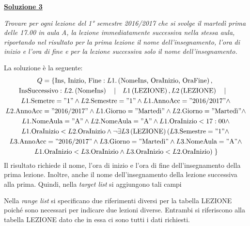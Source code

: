 \documentclass[a4paper]{article}
\begin{document}
	\noindent
	\textcolor{Green4}{\textbf{\underline{Soluzione 3}}}\newline
	
	\noindent
	\emph{Trovare per ogni lezione del 1° semestre 2016/2017 che si svolge il martedì prima delle 17.00 in aula A, la lezione immediatamente successiva nella stessa aula, riportando nel risultato per la prima lezione il nome dell’insegnamento, l’ora di inizio e l’ora di fine e per la lezione successiva solo il nome dell’insegnamento.}\newline
	
	\noindent
	La soluzione è la seguente:
	\begin{gather*}
		Q = \left\{
		\text{Ins, Inizio, Fine}: L1.\left(\text{NomeIns, OraInizio, OraFine}\right), \right. \\
		\text{InsSuccessivo}: L2.\left(\text{NomeIns}\right) \hspace{1em} | \hspace{1em} L1\left(\text{LEZIONE}\right), L2\left(\text{LEZIONE}\right) \hspace{1em} | \hspace{1em} \\
		L1.\text{Semetre} = "1" \land L2.\text{Semestre} = "1" \land L1.\text{AnnoAcc} = "2016/2017" \land \\
		L2.\text{AnnoAcc} = "2016/2017" \land L1.\text{Giorno} = "\text{Martedì}" \land L2.\text{Giorno} = "\text{Martedì}" \land \\
		L1.\text{NomeAula} = "\text{A}" \land L2.\text{NomeAula} = "\text{A}" \land L1.\text{OraInizio} < 17:00 \land \\ L1.\text{OraInizio} < L2.\text{OraInizio} \land \lnot \exists L3\left(\text{LEZIONE}\right)\left( L3.\text{Semestre} = "1" \land \right. \\
		L3.\text{AnnoAcc} = "2016/2017" \land L3.\text{Giorno} = "\text{Martedì}" \land L3.\text{NomeAula} = "\text{A}" \land \\
		\left. L1.\text{OraInizio} < L3.\text{OraInizio} \land L3.\text{OraInizio} < L2.\text{OraInizio}
		\right)\left.
		\right\}
	\end{gather*}
	Il risultato richiede il nome, l'ora di inizio e l'ora di fine dell'insegnamento della prima lezione. Inoltre, anche il nome dell'insegnamento della lezione successiva alla prima. Quindi, nella \emph{target list} si aggiungono tali campi\newline
	
	\noindent
	Nella \emph{range list} si specificano due riferimenti diversi per la tabella LEZIONE poiché sono necessari per indicare due lezioni diverse. Entrambi si riferiscono alla tabella LEZIONE dato che in essa ci sono tutti i dati richiesti.\newline
	
\end{document}
